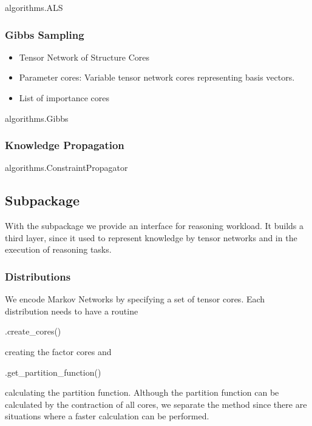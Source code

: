 \begin{centeredcode}
	algorithms.ALS
\end{centeredcode}

\subsubsection{Gibbs Sampling}

\begin{itemize}
	\item Tensor Network of Structure Cores
	\item Parameter cores: Variable tensor network cores representing basis vectors.
	\item List of importance cores
\end{itemize}

\begin{centeredcode}
	algorithms.Gibbs
\end{centeredcode}


\subsubsection{Knowledge Propagation}

\begin{centeredcode}
	algorithms.ConstraintPropagator
\end{centeredcode}


\subsection{Subpackage \spknowledge}

With the \spknowledge subpackage we provide an interface for reasoning workload.
It builds a third layer, since it used \spencoding to represent knowledge by tensor networks and \spalgorithms in the execution of reasoning tasks.

\subsubsection{Distributions}


We encode Markov Networks by specifying a set of tensor cores.
Each distribution needs to have a routine
\begin{centeredcode}
	.create\_cores()
\end{centeredcode}
creating the factor cores and 
\begin{centeredcode}
	.get\_partition\_function()
\end{centeredcode}
calculating the partition function.
Although the partition function can be calculated by the contraction of all cores, we separate the method since there are situations where a faster calculation can be performed.


